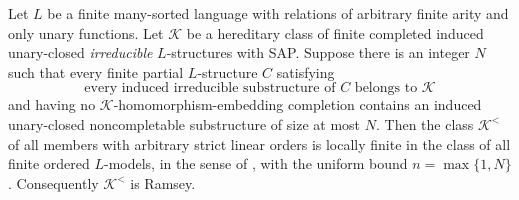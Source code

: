 \begin{theorem}
\label{thm:unary-hn-irreducible-source-transfer}
Let $L$ be a finite many-sorted language with relations of arbitrary finite
arity and only unary functions. Let $\mathcal K$ be a hereditary class of
finite completed induced unary-closed \emph{irreducible} $L$-structures
with SAP. Suppose there is an integer $N$ such that every finite partial
$L$-structure $C$ satisfying
\[
  \text{every induced irreducible substructure of $C$ belongs to
  $\mathcal K$}
\]
and having no $\mathcal K$-homomorphism-embedding completion contains an
induced unary-closed noncompletable substructure of size at most $N$.
Then the class $\mathcal K^<$ of all members with arbitrary strict linear
orders is locally finite in the class of all finite ordered $L$-models,
in the sense of \cite[Definition~2.8]{HN-Ramsey}, with the uniform bound
$n=\max\{1,N\}$. Consequently $\mathcal K^<$ is Ramsey.
\end{theorem}
